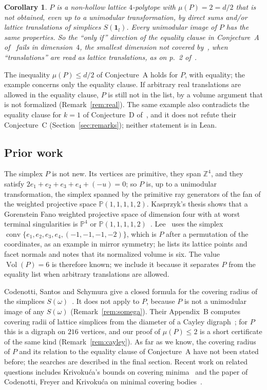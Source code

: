 \documentclass[11pt]{article}
\newtheorem{corollary}{Corollary}
\theoremstyle{definition}
\theoremstyle{remark}
\newcommand{\Z}{\mathbb Z}
\newcommand{\one}{\mathbf 1}
\newcommand{\conv}{\operatorname{conv}}
\newcommand{\Vol}{\operatorname{Vol}}
\begin{document}
\begin{corollary}\label{cor:A}
$P$ is a non-hollow lattice $4$-polytope with $\mu(P)=2=d/2$ that is not
obtained, even up to a unimodular transformation, by direct sums and/or
lattice translations of simplices $S(\one_l)$. Every unimodular image of $P$
has the same properties. So the ``only if'' direction of the equality clause
in Conjecture~A of~\cite{css} fails in dimension~$4$, the smallest dimension
not covered by~\cite[Theorem~1.3]{css}, when ``translations'' are read as
lattice translations, as on p.~2 of~\cite{css}.
\end{corollary}

\noindent The inequality $\mu(P)\le d/2$ of Conjecture~A holds for $P$, with
equality; the example concerns only the equality clause. If arbitrary real
translations are allowed in the equality clause, $P$ is still not in the
list, by a volume argument that is not formalized (Remark~\ref{rem:real}).
The same example also contradicts the equality clause for $k=1$ of
Conjecture~D of~\cite{css}, and it does not refute their Conjecture~C
(Section~\ref{sec:remarks}); neither statement is in Lean.

\subsection*{Prior work}
The simplex $P$ is not new. Its vertices are primitive, they span $\Z^4$, and
they satisfy $2e_1+e_2+e_3+e_4+(-u)=0$; so $P$ is, up to a unimodular
transformation, the simplex spanned by the primitive ray generators of the
fan of the weighted projective space $\mathbb P(1,1,1,1,2)$. Kasprzyk's thesis
shows that a Gorenstein Fano weighted projective space of dimension four with
at worst terminal singularities is $\mathbb P^4$ or
$\mathbb P(1,1,1,1,2)$~\cite[Proposition~9.7.10]{kas}. Lee~\cite[Appendix~C]{lee} uses
the simplex $\conv\{e_1,e_2,e_3,e_4,(-1,-1,-1,-2)\}$, which is $P$ after a
permutation of the coordinates, as an example in mirror symmetry; he lists
its lattice points and facet normals and notes that its normalized volume is
six. The value $\Vol(P)=6$ is therefore known; we include it because it
separates $P$ from the equality list when arbitrary translations are allowed.

Codenotti, Santos and Schymura give a closed formula for the covering radius
of the simplices $S(\omega)$~\cite[Theorem~1.4]{css}. It does not apply to $P$,
because $P$ is not a unimodular image of any $S(\omega)$
(Remark~\ref{rem:somega}). Their Appendix~B computes covering radii of lattice
simplices from the diameter of a Cayley digraph~\cite[Lemmas~B.1
and~B.2]{css}; for $P$ this is a digraph on $216$ vertices, and our proof of
$\mu(P)\le2$ is a short certificate of the same kind (Remark~\ref{rem:cayley}).
As far as we know, the covering radius of $P$ and its relation to the
equality clause of Conjecture~A have not been stated before; the searches are
described in the final section. Recent work on related questions includes
Krivokuća's bounds on covering minima~\cite{kr} and the paper of Codenotti,
Freyer and Krivokuća on minimal covering bodies~\cite{cfk}.
\end{document}
